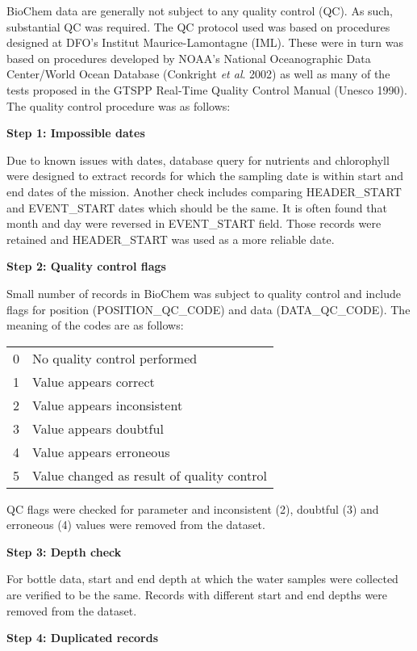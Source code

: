 \documentclass[letterpaper,portrait,11pt]{scrartcl}
\numberwithin{equation}{section}		%
\numberwithin{figure}{section}			%
\numberwithin{table}{section}				%
\begin{document}
\begin{itemize*}
\begin{appendices}
BioChem data are generally not subject to any quality control (QC). As such, substantial QC was required. The QC protocol used was based on procedures designed at DFO's Institut Maurice-Lamontagne (IML). These were in turn was based on procedures developed by NOAA's National Oceanographic Data Center/World Ocean Database (Conkright \textit{et al}. 2002) as well as many of the tests proposed in the GTSPP Real-Time Quality Control Manual (Unesco 1990). The quality control procedure was as follows:

\textbf{Step 1: Impossible dates}

Due to known issues with dates, database query for nutrients and chlorophyll were designed to extract records for which the sampling date is within start and end dates of the mission. Another check includes comparing HEADER\_START and EVENT\_START dates which should be the same. It is often found that month and day were reversed in EVENT\_START field. Those records were retained and HEADER\_START was used as a more reliable date.

\textbf{Step 2: Quality control flags}

Small number of records in BioChem was subject to quality control and  include flags for position (POSITION\_QC\_CODE) and data (DATA\_QC\_CODE). The meaning of the codes are as follows:

\begin{table} [h]
\begin{tabular}{ll}
0 & No quality control performed \\
1 & Value appears correct \\
2 & Value appears inconsistent \\
3 & Value appears doubtful \\
4 & Value  appears erroneous \\
5 & Value changed as result of quality control \\
\end{tabular}
\end{table}

QC flags were checked for parameter and inconsistent (2), doubtful (3) and erroneous (4) values were removed from the dataset.

\textbf{Step 3: Depth check}

For bottle data, start and end depth at which the water samples were collected are verified to be the same. Records with different start and end depths were removed from the dataset.

\textbf{Step 4: Duplicated records}


\end{appendices}
\end{itemize*}
\end{document}
